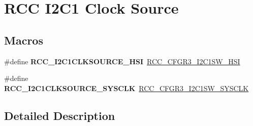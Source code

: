 \hypertarget{group___r_c_c___i2_c1___clock___source}{}\section{R\+CC I2\+C1 Clock Source}
\label{group___r_c_c___i2_c1___clock___source}
\subsection*{Macros}
\begin{DoxyCompactItemize}
\item 
\mbox{\label{group___r_c_c___i2_c1___clock___source_ga5645524b292048cfe127da02ba9b3df7}} 
\#define {\bfseries R\+C\+C\+\_\+\+I2\+C1\+C\+L\+K\+S\+O\+U\+R\+C\+E\+\_\+\+H\+SI}~\hyperlink{group___peripheral___registers___bits___definition_gaad1d0cd9a6442ea0a9de886f7e2f0ecc}{R\+C\+C\+\_\+\+C\+F\+G\+R3\+\_\+\+I2\+C1\+S\+W\+\_\+\+H\+SI}
\item 
\mbox{\label{group___r_c_c___i2_c1___clock___source_ga1a04c52a4f4665188e40cd7f4018ea3f}} 
\#define {\bfseries R\+C\+C\+\_\+\+I2\+C1\+C\+L\+K\+S\+O\+U\+R\+C\+E\+\_\+\+S\+Y\+S\+C\+LK}~\hyperlink{group___peripheral___registers___bits___definition_ga5654d9fb8dfeb19e55cffc9a7c280ec3}{R\+C\+C\+\_\+\+C\+F\+G\+R3\+\_\+\+I2\+C1\+S\+W\+\_\+\+S\+Y\+S\+C\+LK}
\end{DoxyCompactItemize}


\subsection{Detailed Description}
